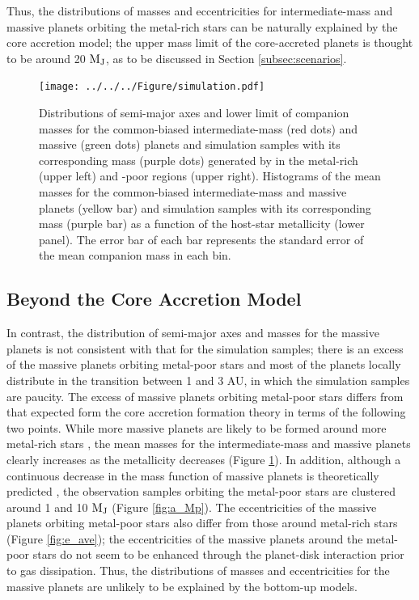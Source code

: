 \documentclass[twocolumn, dvipdfmx]{aastex62}
\begin{document}
\begin{CJK*}{UTF8}{min}
Thus, the distributions of masses and eccentricities for intermediate-mass and massive planets orbiting the metal-rich stars can be naturally explained by the core accretion model; the upper mass limit of the core-accreted planets is thought to be around 20 $\rm M_J$, as to be discussed in Section \ref{subsec:scenarios}.

\begin{figure}[t]
\begin{center}
\texttt{[image: ../../../Figure/simulation.pdf]}
\caption{Distributions of semi-major axes and lower limit of companion masses for the common-biased intermediate-mass (red dots) and massive (green dots) planets and simulation samples with its corresponding mass (purple dots) generated by \cite{2012A&A...541A..97M} in the metal-rich (upper left) and -poor regions (upper right). Histograms of the mean masses for the common-biased intermediate-mass and massive planets (yellow bar) and simulation samples with its corresponding mass (purple bar) as a function of the host-star metallicity (lower panel). The error bar of each bar represents the standard error of the mean companion mass in each bin. \label{fig:simulation}}
\end{center}
\end{figure}


\subsection{Beyond the Core Accretion Model} \label{subsec:beyond}

In contrast, the distribution of semi-major axes and masses for the massive planets is not consistent with that for the simulation samples; there is an excess of the massive planets orbiting metal-poor stars and most of the planets locally distribute in the transition between 1 and 3 AU, in which the simulation samples are paucity. The excess of massive planets orbiting metal-poor stars differs from that expected form the core accretion formation theory in terms of the following two points. While more massive planets are likely to be formed around more metal-rich stars \citep{2012A&A...541A..97M}, the mean masses for the intermediate-mass and massive planets clearly increases as the metallicity decreases (Figure \ref{fig:simulation}). In addition, although a continuous decrease in the mass function of massive planets is theoretically predicted \citep{2009A&A...501.1161M}, the observation samples orbiting the metal-poor stars are clustered around 1 and 10 $\rm M_J$ (Figure \ref{fig:a_Mp}). The eccentricities of the massive planets orbiting metal-poor stars also differ from those around metal-rich stars (Figure \ref{fig:e_ave}); the eccentricities of the massive planets around the metal-poor stars do not seem to be enhanced through the planet-disk interaction prior to gas dissipation. Thus, the distributions of masses and eccentricities for the massive planets are unlikely to be explained by the bottom-up models.


\end{CJK*}
\end{document}
